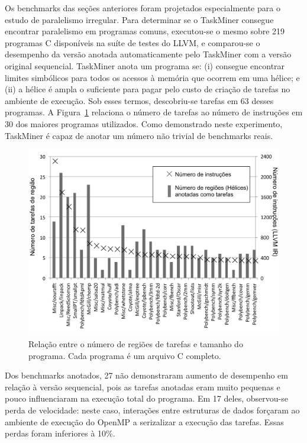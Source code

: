 \documentclass[sigplan,10pt,review]{acmart}
\newcommand\Taskminer{\mbox{\textsf{TaskMiner}}}
\begin{document}
Os benchmarks das seções anteriores foram projetados especialmente para o estudo de 
paralelismo irregular. Para determinar se o \Taskminer{} consegue encontrar paralelismo 
em programas comuns, executou-se o mesmo sobre 219 programas C disponíveis
na suíte de testes do LLVM, e comparou-se o desempenho da versão anotada automaticamente pelo
\Taskminer{} com a versão original sequencial. 
\Taskminer{} anota um programa se:
(i) consegue encontrar limites simbólicos para todos os acessos à memória que ocorrem em uma hélice; e
(ii) a hélice é ampla o suficiente para pagar pelo custo de criação de tarefas no ambiente de execução.
Sob esses termos, descobriu-se tarefas em 63 desses programas. A Figura~\ref{fig:TM_Versatility} relaciona
o número de tarefas ao número de instruções em 30 dos maiores programas utilizados.
Como demonstrado neste experimento,
\Taskminer{} é capaz de anotar um número não trivial de benchmarks reais.

\begin{figure}[htb]
\begin{center}
\includegraphics[width=1\columnwidth]{images/TM_Versatility}
\caption{Relação entre o número de regiões de tarefas e tamanho do programa.
Cada programa é um arquivo C completo.}
\label{fig:TM_Versatility}
\end{center}
\end{figure}

Dos benchmarks anotados, 27 não demonstraram aumento de desempenho em 
relação à versão sequencial,
pois as tarefas anotadas eram muito pequenas e pouco influenciaram na execução total do programa.
Em 17 deles, observou-se perda de velocidade: neste caso, interações entre estruturas de dados
forçaram ao ambiente de execução do OpenMP a serizalizar a execução das tarefas. 
Essas perdas foram 
inferiores à 10\%. 
\end{document}
